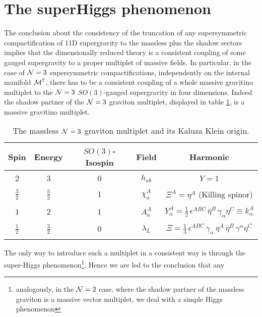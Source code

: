 \documentclass[a4paper,11pt]{article}
\newcommand{\ft}[2]{{\textstyle\frac{#1}{#2}}}
\begin{document}
\section{The superHiggs phenomenon}
The conclusion about the consistency of the truncation of any
supersymmetric compactification of 11D supergravity to the
massless plus the shadow sectors implies that the dimensionally
reduced theory is a consistent coupling of some gauged
supergravity to a proper multiplet of massive fields. In
particular, in the case of ${\cal N}=3$ supersymmetric
compactifications, independently on the internal manifold ${\cal
M}^7$, there has to be a consistent coupling of a whole massive
gravitino multiplet to the ${\cal N}=3$ $SO(3)$-gauged
supergravity in four dimensions. Indeed the shadow partner of the
${\cal N}=3$ graviton multiplet, displayed in table
\ref{ushorgrav}, is a massive gravitino multiplet.
%
\begin{table}
  \begin{center}
{\small
 \begin{tabular}{ccc|cc}
      \hline\hline
      Spin & Energy & $SO(3)$-Isospin  & Field & Harmonic\\
      \hline &&&&\\
      $2$ & $3$ & $0$ & $h_{ab}$ & $Y=1$\\
      &&&&\\
      $\ft32$ & $\ft52$ & $1$& $\chi^A_a$ &
           $\Xi^A =\eta^A$ (Killing spinor) \\
      &&&&\\
      $1$  & $2$ & $1$ &$A_a^A$&
      $Y^A_\alpha =\ft 12 \, \epsilon^{ABC} \,
      {\bar \eta}^B \, \gamma_\alpha  \eta^C \equiv k^A_\alpha $
      \\
      &&&&\\
      $\ft12$  & $\ft32$ & $0$ & $ \lambda_L$ & $\Xi=\ft 13
      \,\epsilon^{ABC}\, \gamma_\alpha \, \eta^A \,{\bar \eta}^B \,
      \gamma^\alpha  \eta^C $\\
      &&&&\\
      \hline\hline
    \end{tabular}
    }
    \caption{The massless ${\cal N}=3$ graviton multiplet and
    its Kaluza Klein origin.}
    \label{ushorgrav}
  \end{center}
\end{table}
%
The only way to introduce such a multiplet in a consistent way is
through the super-Higgs phenomenon\footnote{analogously, in the
${\cal N}=2$ case, where the shadow partner of the massless
graviton is a massive vector multiplet, we deal with a simple
Higgs phenomenon}. Hence we are led to the conclusion that any
\end{document}
